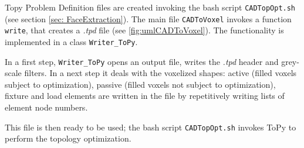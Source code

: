 Topy Problem Definition files are created invoking the bash script \lstinline|CADTopOpt.sh| (see section \ref{sec: FaceExtraction}). The main file \lstinline|CADToVoxel| invokes a function \lstinline|write|, that creates a {\it.tpd} file (see \autoref{fig:umlCADToVoxel}). The functionality is implemented in a class \lstinline|Writer_ToPy|.

In a first step, \lstinline|Writer_ToPy| opens an output file, writes the {\it.tpd} header and grey-scale filters. In a next step it deals with the voxelized shapes: active (filled voxels subject to optimization), passive (filled voxels not subject to optimization), fixture and load elements are written in the file by repetitively writing lists of element node numbers.   

This file is then ready to be used; the bash script \lstinline|CADTopOpt.sh| invokes ToPy to perform the topology optimization. 